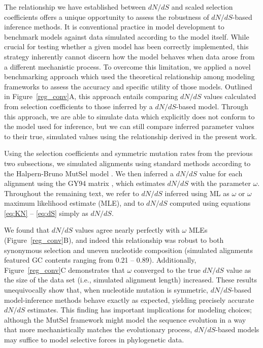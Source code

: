 \documentclass[11pt]{article}
\begin{document}
The relationship we have established between $dN/dS$ and scaled selection coefficients offers a unique opportunity to assess the robustness of $dN/dS$-based inference methods. It is conventional practice in model development to benchmark models against data simulated according to the model itself. While crucial for testing whether a given model has been correctly implemented, this strategy inherently cannot discern how the model behaves when data arose from a different mechanistic process. To overcome this limitation, we applied a novel benchmarking approach which used the theoretical relationship among modeling frameworks to assess the accuracy and specific utility of those models. Outlined in Figure~\ref{reg_conv}A, this approach entails comparing $dN/dS$ values calculated from selection coefficients to those inferred by a $dN/dS$-based model. Through this approach, we are able to simulate data which explicitly does not conform to the model used for inference, but we can still compare inferred parameter values to their true, simulated values using the relationship derived in the present work.

Using the selection coefficients and symmetric mutation rates from the previous two subsections, we simulated alignments using standard methods \citep{Yang2006} according to the Halpern-Bruno MutSel model \citep{HalpernBruno1998}. We then inferred a $dN/dS$ value for each alignment using the GY94 matrix \citep{GoldmanYang1994,NielsenYang1998}, which estimates $dN/dS$ with the parameter $\omega$. Throughout the remaining text, we refer to $dN/dS$ inferred using ML as $\omega$ or $\omega$ maximum likelihood estimate (MLE), and to $dN/dS$ computed using equations \eqref{eq:KN} -- \eqref{eq:dS} simply as $dN/dS$. 

We found that $dN/dS$ values agree nearly perfectly with $\omega$ MLEs (Figure~\ref{reg_conv}B), and indeed this relationship was robust to both synonymous selection and uneven nucleotide composition (simulated alignments featured GC contents ranging from 0.21 -- 0.89). Additionally, Figure~\ref{reg_conv}C demonstrates that $\omega$ converged to the true $dN/dS$ value as the size of the data set (i.e., simulated alignment length) increased. These results unequivocally show that, when nucleotide mutation is symmetric,  $dN/dS$-based model-inference methods behave exactly as expected, yielding precisely accurate $dN/dS$ estimates. This finding has important implications for modeling choices; although the MutSel framework might model the sequence evolution in a way that more mechanistically matches the evolutionary process, $dN/dS$-based models may suffice to model selective forces in phylogenetic data.
\end{document}
